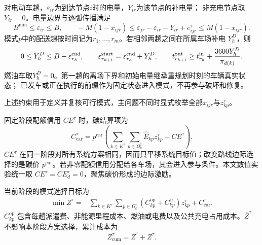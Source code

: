 \documentclass{setp-new}
\begin{document}
对电动车趟，$\varepsilon_{ir}$为到达节点$i$时的电量，$Y_{ir}$为该节点的补电量；
非充电节点取$Y_{ir}=0$。电量边界与逐弧传播满足
\begin{equation}
B^{\min}\le\varepsilon_{ir}\le B,\qquad
-M(1-x_{ijr})\le
\varepsilon_{jr}-\varepsilon_{ir}-Y_{ir}+e_{ijr}^\tau
\le M(1-x_{ijr}).
\label{eq:trip-energy}
\end{equation}
模式$p$中的配送趟按时间记为$r_1,\ldots,r_m$。若相邻两趟之间在所属车场补电
$Y_h^D$，则
\begin{equation}
0\le Y_h^D\le B-\varepsilon_{r_h}^{\rm end},\qquad
\varepsilon_{r_{h+1}}^{\rm start}=\varepsilon_{r_h}^{\rm end}+Y_h^D,\qquad
t_{r_{h+1}}^{\rm out}\ge t_{r_h}^{\rm in}+\frac{3600Y_h^D}{\pi_{d(k)}}.
\label{eq:intertrip-link}
\end{equation}
燃油车取$Y_h^D=0$。第一趟的离场下界和初始电量继承重规划时刻的车辆真实状态；
已发车或正在执行的前缀作为固定状态进入模式，不再参与破坏和修复。

上述约束用于定义并复核可行模式，主问题不同时显式枚举全部$x_{ijr}$与$z_{kp}^\tau$。

固定阶段配额信用 $CE^\tau$ 时，碳结算项为
\begin{equation}
C_{\mathrm{car}}^\tau=p^{\mathrm{car}}
\left(\sum_{k\in K^\tau}\sum_{p\in\Omega_k^\tau}\widehat E_{kp}z_{kp}^\tau-CE^\tau\right).
\label{eq:carbon_trading}
\end{equation}
$CE^\tau$ 在同一阶段对所有系统方案相同，因而只平移系统目标值；改变路线边际选择的是碳价 $p^{\mathrm{car}}$。若非零配额信用分配给各车场，其会进入参与条件。本文数值实验统一取 $CE^\tau=CE_d^\tau=0$，聚焦碳价形成的边际激励。

当前阶段的模式选择目标为
\begin{equation}
\begin{aligned}
\min Z^\tau={}&
\sum_{k\in K^\tau}\sum_{p\in\Omega_k^\tau}
\left(C_{kp}^{\mathrm{op}}+C_{kp}^{\mathrm{tr}}\right)z_{kp}^\tau
+C_{\mathrm{car}}^\tau .
\end{aligned}
\label{eq:objective}
\end{equation}
$C_{kp}^{\mathrm{op}}$ 包含每趟派遣费、非能源里程成本、燃油或电费以及公共充电占用成本。$\bar Z^\tau$ 不影响本阶段方案选择，累计成本为
\begin{equation}
Z_{\mathrm{cum}}^\tau=\bar Z^\tau+Z^\tau.
\label{eq:cumulative-cost}
\end{equation}
\end{document}
